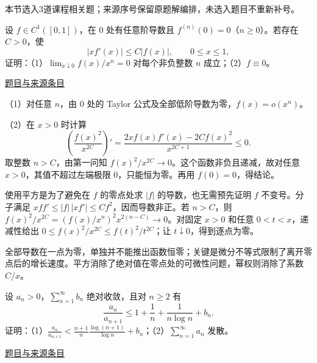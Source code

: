 \documentclass[UTF8,12pt,a4paper,fontset=fandol]{ctexart}
\begin{document}
本节选入3道课程相关题；来源序号保留原题解编排，未选入题目不重新补号。

\begin{example}[来源序号4]\label{ex:pre10-math:4}\label{pr:pre10-math:4}

设 $f\in C^1([0,1])$，在 $0$ 处有任意阶导数且 $f^{(n)}(0)=0$（$n\ge0$）。若存在 $C>0$，使
\[
|xf'(x)|\le C|f(x)|,\qquad 0\le x\le1,
\]
证明：（1）$\lim_{x\downarrow0}f(x)/x^n=0$ 对每个非负整数 $n$ 成立；（2）$f\equiv0$。

\par\href{https://github.com/lzxcr/cmc-mathematics/blob/64916fa1fdbc3e444a652eca204d5669058ee321/src/problems/preliminary/10/04.md}{题目与来源条目}

\end{example}

\begin{solve}\label{ans:pre10-math:4}

（1）对任意 $n$，由 $0$ 处的 Taylor 公式及全部低阶导数为零，$f(x)=o(x^n)$。

（2）在 $x>0$ 时计算
\[
\left(\frac{f(x)^2}{x^{2C}}\right)'
=\frac{2xf(x)f'(x)-2Cf(x)^2}{x^{2C+1}}\le0.
\]
取整数 $n>C$，由第一问知 $f(x)^2/x^{2C}\to0$。这个函数非负且递减，故对任意 $x>0$，其值不超过左端极限 $0$，只能恒为零。再用 $f(0)=0$，得结论。

使用平方是为了避免在 $f$ 的零点处求 $|f|$ 的导数，也无需预先证明 $f$ 不变号。分子满足 $xf f'\le |f|\,|xf'|\le Cf^2$，因而导数非正。若 $n>C$，则 $f(x)^2/x^{2C}=(f(x)/x^n)^2x^{2(n-C)}\to0$。对固定 $x>0$ 和任意 $0<t<x$，递减性给出 $0\le f(x)^2/x^{2C}\le f(t)^2/t^{2C}$；让 $t\downarrow0$，得到逐点为零。

\end{solve}

\begin{remark}[方法与条件]全部导数在一点为零，单独并不能推出函数恒零；关键是微分不等式限制了离开零点后的增长速度。平方消除了绝对值在零点处的可微性问题，幂权则消除了系数 $C/x$。\end{remark}

\begin{example}[来源序号5]\label{ex:pre10-math:5}\label{pr:pre10-math:5}

设 $a_n>0$，$\sum_{n=1}^\infty b_n$ 绝对收敛，且对 $n\ge2$ 有
\[
\frac{a_n}{a_{n+1}}\le1+\frac1n+\frac1{n\log n}+b_n.
\]
证明：（1）$\displaystyle\frac{a_n}{a_{n+1}}<\frac{n+1}{n}\frac{\log(n+1)}{\log n}+b_n$；（2）$\sum_{n=1}^\infty a_n$ 发散。

\par\href{https://github.com/lzxcr/cmc-mathematics/blob/64916fa1fdbc3e444a652eca204d5669058ee321/src/problems/preliminary/10/05.md}{题目与来源条目}

\end{example}
\end{document}
